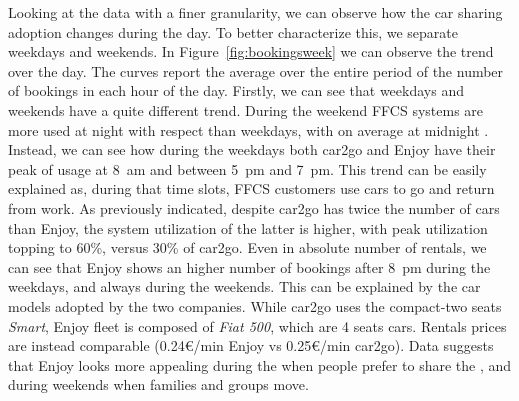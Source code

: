 Looking at the data with a finer granularity, we can observe how the car sharing adoption changes during the day. To better characterize this, we separate weekdays and weekends. In Figure~\ref{fig:bookingsweek} we can observe the trend over the day. The curves report the average over the entire period of the number of bookings in each hour of the day.
Firstly, we can see that weekdays and weekends have a quite different trend. During the weekend FFCS systems are more used at night with respect than weekdays, with on average at midnight . Instead, we can see how during the weekdays both car2go and Enjoy have their peak of usage at 8~am and between 5~pm and 7~pm. This trend can be easily explained as, during that time slots, FFCS customers use cars to go and return from work. 
As previously indicated, despite car2go has twice the number of cars than Enjoy, the system utilization of the latter is higher, with peak utilization topping to 60\%, versus 30\% of car2go. 
%
Even in absolute number of rentals, 
we can see that Enjoy shows an higher number of bookings after 8~pm during the weekdays, and always during the weekends. This can be explained by the car models adopted by the two companies. While car2go uses the compact-two seats \textit{Smart}, Enjoy fleet is composed of \textit{Fiat 500}, which are 4 seats cars. Rentals prices are instead comparable (0.24\euro/min Enjoy vs 0.25\euro/min car2go). Data suggests that Enjoy looks more appealing during the  when people prefer to share the , and during weekends when families and groups move. 

